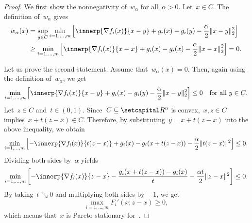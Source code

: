 \documentclass[../../main]{subfiles}
\begin{document}
\begin{proof}
    We first show the nonnegativity of~$w_\alpha$ for all~$\alpha > 0$.
    Let~$x \in C$.
    The definition of~$w_\alpha$ gives
    \begin{align}
        w_\alpha(x) &= \sup_{y \in C} \min_{i = 1, \dots, m} \left[ \innerp{\nabla f_i(x)}{x - y} + g_i(x) - g_i(y) - \frac{\alpha}{2} \norm{x - y}_2^2 \right] \\
                    &\ge \min_{i = 1, \dots, m} \left[ \innerp{\nabla f_i(x)}{x - x} + g_i(x) - g_i(x) - \frac{\alpha}{2} \norm*{x - x}_2^2 \right] = 0
                .\end{align}

                Let us prove the second statement.
                Assume that~$w_\alpha(x) = 0$.
                Then, again using the definition of~$w_\alpha$, we get
                \begin{equation}
                    \min_{i = 1, \dots, m} \left[ \innerp{\nabla f_i(x)}{x - y} + g_i(x) - g_i(y) - \frac{\alpha}{2} \norm{x - y}_2^2 \right] \le 0 \forallcondition{y \in C}
                .\end{equation} 
                Let~$z \in C$ and~$t \in (0, 1)$.
                Since~$C \subseteq \setR^n$ is convex,~$x, z \in C$ implies~$x + t (z - x) \in C$.
                Therefore, by substituting~$y = x + t (z - x)$ into the above inequality, we obtain
                \begin{equation}
                    \min_{i = 1, \dots, m} \left[ - \innerp{\nabla f_i(x)}{t (z - x)} + g_i(x) - g_i(x + t (z - x)) - \frac{\alpha}{2} \norm{t (z - x)}^2 \right] \le 0
                .\end{equation} 
                Dividing both sides by~$\alpha$ yields
                \begin{equation}
                    \min_{i = 1, \dots, m} \left[ - \innerp{\nabla f_i(x)}{z - x} - \frac{g_i(x + t (z - x)) - g_i(x)}{t} - \frac{\alpha t}{2} \norm{z - x}^2 \right] \le 0
                .\end{equation} 
                By taking~$t \searrow 0$ and multiplying both sides by~$- 1$, we get
                \begin{equation}
                    \max_{i = 1, \dots, m} F_i'(x; z - x) \ge 0
                ,\end{equation} 
                which means that~$x$ is Pareto stationary for~.


\end{proof}
\end{document}
